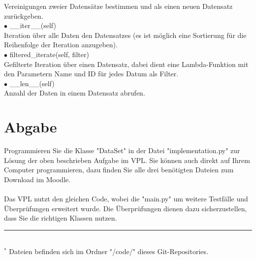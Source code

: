 \documentclass[]{article}
\begin{document}
\hspace*{1cm} Vereinigungen zweier Datensätze bestimmen und als einen neuen Datensatz zurückgeben.\\
$\bullet$ \_\_iter\_\_(self)\\
\hspace*{1cm} Iteration über alle Daten den Datensatzes (es ist möglich eine Sortierung für die Reihenfolge der Iteration anzugeben).\\ 
$\bullet$ filtered\_iterate(self, filter)\\
\hspace*{1cm} Gefilterte Iteration über einen Datensatz, dabei dient eine Lambda-Funktion mit den Parametern Name und ID für jedes Datum als Filter.\\
$\bullet$ \_\_len\_\_(self)\\
\hspace*{1cm} Anzahl der Daten in einem Datensatz abrufen.\\
\section{Abgabe}
Programmieren Sie die Klasse "DataSet" in der Datei "implementation.py" zur Lösung der oben beschrieben Aufgabe im VPL.
Sie können auch direkt auf Ihrem Computer programmieren, dazu finden Sie alle drei benötigten Dateien zum Download im Moodle.\\
\\
Das VPL nutzt den gleichen Code, wobei die "main.py" um weitere Testfälle und Überprüfungen erweitert wurde.
Die Überprüfungen dienen dazu sicherzustellen, dass Sie die richtigen Klassen nutzen.\\
%
\hrule\hfill\\[0.2cm]
$^*$ Dateien befinden sich im Ordner "/code/" dieses Git-Repositories.\\
\end{document}

